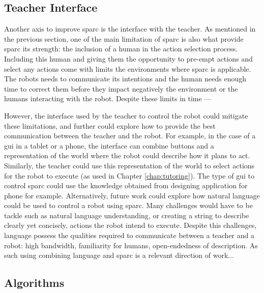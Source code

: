 
\subsection{Teacher Interface}

Another axis to improve \gls{sparc} is the interface with the teacher. As mentioned in the previous section, one of the main limitation of \gls{sparc} is also what provide \gls{sparc} its strength: the inclusion of a human in the action selection process. Including this human and giving them the opportunity to pre-empt actions and select any actions come with limits the environments where \gls{sparc} is applicable. The robots needs to communicate its intentions and the human needs enough time to correct them before they impact negatively the environment or the humans interacting with the robot. Despite these limits in time ---

However, the interface used by the teacher to control the robot could mitigate these limitations, and further could explore how to provide the best communication between the teacher and the robot. For example, in the case of a \gls{gui} in a tablet or a phone, the interface can combine buttons and a representation of the world where the robot could describe how it plans to act. Similarly, the teacher could use this representation of the world to select actions for the robot to execute (as used in Chapter \ref{chap:tutoring}). The type of \gls{gui} to control \gls{sparc} could use the knowledge obtained from designing application for phone for example. Alternatively, future work could explore how natural language could be used to control a robot using \gls{sparc}. Many challenges would have to be tackle such as natural language understanding, or creating a string to describe clearly yet concisely, actions the robot intend to execute. Despite this challenges, language possess the qualities required to communicate between a teacher and a robot: high bandwidth, familiarity for humans, open-endedness of description. As such using combining language and \gls{sparc} is a relevant direction of work...

\subsection{Algorithms}

